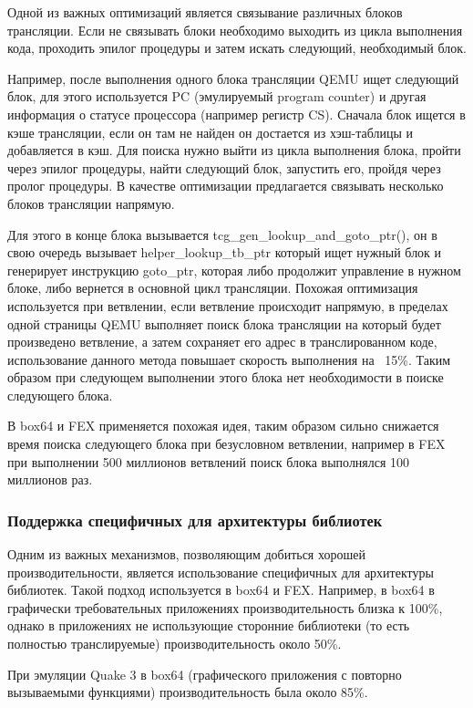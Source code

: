 Одной из важных оптимизаций является связывание различных блоков трансляции. Если не связывать блоки необходимо выходить из цикла выполнения кода, проходить эпилог процедуры и затем искать следующий, необходимый блок.

Например, после выполнения одного блока трансляции QEMU ищет следующий блок, для этого используется PC (эмулируемый program counter) и другая информация о статусе процессора (например регистр CS). Сначала блок ищется в кэше трансляции, если он там не найден он достается из хэш-таблицы и добавляется в кэш. Для поиска нужно выйти из цикла выполнения блока, пройти через эпилог процедуры, найти следующий блок, запустить его, пройдя через пролог процедуры. В качестве оптимизации предлагается связывать несколько блоков трансляции напрямую.

Для этого в конце блока вызывается tcg\_gen\_lookup\_and\_goto\_ptr(), он в свою очередь вызывает helper\_lookup\_tb\_ptr который ищет нужный блок и генерирует инструкцию goto\_ptr, которая либо продолжит управление в нужном блоке, либо вернется в основной цикл трансляции. Похожая оптимизация используется при ветвлении, если ветвление происходит напрямую, в пределах одной страницы QEMU выполняет поиск блока трансляции на который будет произведено ветвление, а затем сохраняет его адрес в транслированном коде, использование данного метода повышает скорость выполнения на ~15\%. Таким образом при следующем выполнении этого блока нет необходимости в поиске следующего блока. \cite{qemu_docs}

В box64 и FEX применяется похожая идея, таким образом сильно снижается время поиска следующего блока при безусловном ветвлении, например в FEX при выполнении 500 миллионов ветвлений поиск блока выполнялся 100 миллионов раз. \cite{fex_video}

\subsubsection{Поддержка специфичных для архитектуры библиотек}

Одним из важных механизмов, позволяющим добиться хорошей производительности, является использование специфичных для архитектуры библиотек. Такой подход используется в box64 и FEX. Например, в box64 в графически требовательных приложениях производительность близка к 100\%, однако в приложениях не использующие сторонние библиотеки (то есть полностью транслируемые) производительность около 50\%.

При эмуляции Quake 3 в box64 (графического приложения с повторно вызываемыми функциями) производительность была около 85\%.

